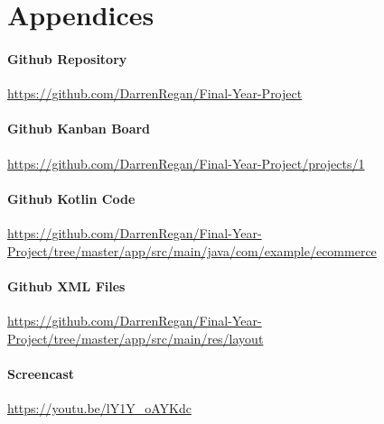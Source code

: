 \chapter{Appendices}

\subsubsection{Github Repository}
\url{https://github.com/DarrenRegan/Final-Year-Project}

\subsubsection{Github Kanban Board}
\url{https://github.com/DarrenRegan/Final-Year-Project/projects/1}

\subsubsection{Github Kotlin Code}
\url{https://github.com/DarrenRegan/Final-Year-Project/tree/master/app/src/main/java/com/example/ecommerce}

\subsubsection{Github XML Files}
\url{https://github.com/DarrenRegan/Final-Year-Project/tree/master/app/src/main/res/layout}

\subsubsection{Screencast}
\url{https://youtu.be/lY1Y_oAYKdc}




